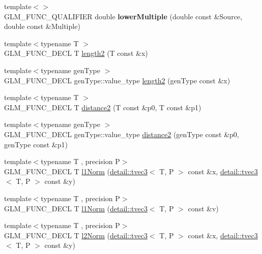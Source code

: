 \begin{DoxyCompactItemize}
\item 
\hypertarget{namespaceglm_ab75ca978940a0ba67a95e13b16cde89e}{{\footnotesize template$<$$>$ }\\G\-L\-M\-\_\-\-F\-U\-N\-C\-\_\-\-Q\-U\-A\-L\-I\-F\-I\-E\-R double {\bfseries lower\-Multiple} (double const \&Source, double const \&Multiple)}\label{namespaceglm_ab75ca978940a0ba67a95e13b16cde89e}

\item 
{\footnotesize template$<$typename T $>$ }\\G\-L\-M\-\_\-\-F\-U\-N\-C\-\_\-\-D\-E\-C\-L T \hyperlink{group__gtx__norm_ga08c670024cd230e22f8b853f185ff533}{length2} (T const \&x)
\item 
{\footnotesize template$<$typename gen\-Type $>$ }\\G\-L\-M\-\_\-\-F\-U\-N\-C\-\_\-\-D\-E\-C\-L gen\-Type\-::value\-\_\-type \hyperlink{group__gtx__norm_gaa279ba7fdecbed3f9f2b60502b7ec8ca}{length2} (gen\-Type const \&x)
\item 
{\footnotesize template$<$typename T $>$ }\\G\-L\-M\-\_\-\-F\-U\-N\-C\-\_\-\-D\-E\-C\-L T \hyperlink{group__gtx__norm_ga3544f6288d3bce2cf2a9f6ebe39e0557}{distance2} (T const \&p0, T const \&p1)
\item 
{\footnotesize template$<$typename gen\-Type $>$ }\\G\-L\-M\-\_\-\-F\-U\-N\-C\-\_\-\-D\-E\-C\-L gen\-Type\-::value\-\_\-type \hyperlink{group__gtx__norm_gaec2d9df62436879b48207d39516f3788}{distance2} (gen\-Type const \&p0, gen\-Type const \&p1)
\item 
{\footnotesize template$<$typename T , precision P$>$ }\\G\-L\-M\-\_\-\-F\-U\-N\-C\-\_\-\-D\-E\-C\-L T \hyperlink{group__gtx__norm_gae7c48d18df3e4a9c13bb9c003e434d5f}{l1\-Norm} (\hyperlink{structglm_1_1detail_1_1tvec3}{detail\-::tvec3}$<$ T, P $>$ const \&x, \hyperlink{structglm_1_1detail_1_1tvec3}{detail\-::tvec3}$<$ T, P $>$ const \&y)
\item 
{\footnotesize template$<$typename T , precision P$>$ }\\G\-L\-M\-\_\-\-F\-U\-N\-C\-\_\-\-D\-E\-C\-L T \hyperlink{group__gtx__norm_ga466d01e7b4350f44250d80ec48128fbd}{l1\-Norm} (\hyperlink{structglm_1_1detail_1_1tvec3}{detail\-::tvec3}$<$ T, P $>$ const \&v)
\item 
{\footnotesize template$<$typename T , precision P$>$ }\\G\-L\-M\-\_\-\-F\-U\-N\-C\-\_\-\-D\-E\-C\-L T \hyperlink{group__gtx__norm_ga46af6669c4e8b042e284dd3b6c0caf28}{l2\-Norm} (\hyperlink{structglm_1_1detail_1_1tvec3}{detail\-::tvec3}$<$ T, P $>$ const \&x, \hyperlink{structglm_1_1detail_1_1tvec3}{detail\-::tvec3}$<$ T, P $>$ const \&y)

\end{DoxyCompactItemize}
